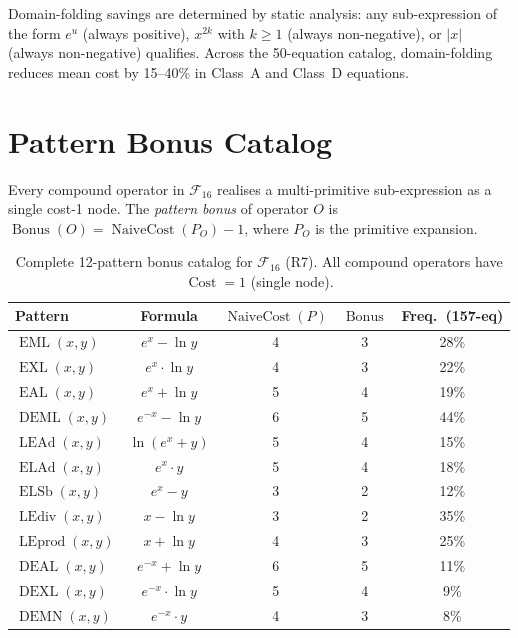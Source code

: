 \documentclass[12pt,a4paper]{article}
\theoremstyle{definition}
\newcommand{\EML}{\operatorname{EML}}
\newcommand{\EXL}{\operatorname{EXL}}
\newcommand{\EAL}{\operatorname{EAL}}
\newcommand{\DEML}{\operatorname{DEML}}
\newcommand{\ELAd}{\operatorname{ELAd}}
\newcommand{\ELSb}{\operatorname{ELSb}}
\newcommand{\LEAd}{\operatorname{LEAd}}
\newcommand{\LEdiv}{\operatorname{LEdiv}}
\newcommand{\LEprod}{\operatorname{LEprod}}
\newcommand{\DEAL}{\operatorname{DEAL}}
\newcommand{\DEXL}{\operatorname{DEXL}}
\newcommand{\DEMN}{\operatorname{DEMN}}
\newcommand{\Cost}{\operatorname{Cost}}
\newcommand{\NC}{\operatorname{NaiveCost}}
\newcommand{\Bonus}{\operatorname{Bonus}}
\begin{document}
Domain-folding savings are determined by static analysis: any sub-expression
of the form $e^u$ (always positive), $x^{2k}$ with $k \geq 1$ (always
non-negative), or $|x|$ (always non-negative) qualifies.  Across the 50-equation
catalog, domain-folding reduces mean cost by 15--40\% in Class~A and Class~D
equations.

\section{Pattern Bonus Catalog}
\label{sec:patterns}

Every compound operator in $\mathcal{F}_{16}$ realises a multi-primitive
sub-expression as a single cost-1 node.  The \emph{pattern bonus} of
operator $O$ is $\Bonus(O) = \NC(P_O) - 1$, where $P_O$ is the primitive
expansion.

\begin{table}[h]
\centering
\caption{Complete 12-pattern bonus catalog for $\mathcal{F}_{16}$ (R7).
         All compound operators have $\Cost=1$ (single node).}
\label{tab:patterns}
\smallskip
\begin{tabular}{@{}lcccc@{}}
\toprule
\textbf{Pattern} & \textbf{Formula} &
  $\NC(P)$ & $\Bonus$ & \textbf{Freq.\ (157-eq)} \\
\midrule
$\EML(x,y)$   & $e^x - \ln y$        & 4  & 3 & 28\% \\
$\EXL(x,y)$   & $e^x \cdot \ln y$    & 4  & 3 & 22\% \\
$\EAL(x,y)$   & $e^x + \ln y$        & 5  & 4 & 19\% \\
$\DEML(x,y)$  & $e^{-x} - \ln y$     & 6  & 5 & 44\% \\
$\LEAd(x,y)$  & $\ln(e^x + y)$       & 5  & 4 & 15\% \\
$\ELAd(x,y)$  & $e^x \cdot y$        & 5  & 4 & 18\% \\
$\ELSb(x,y)$  & $e^x - y$            & 3  & 2 & 12\% \\
$\LEdiv(x,y)$ & $x - \ln y$          & 3  & 2 & 35\% \\
$\LEprod(x,y)$& $x + \ln y$          & 4  & 3 & 25\% \\
$\DEAL(x,y)$  & $e^{-x} + \ln y$     & 6  & 5 & 11\% \\
$\DEXL(x,y)$  & $e^{-x} \cdot \ln y$ & 5  & 4 & 9\%  \\
$\DEMN(x,y)$  & $e^{-x} \cdot y$     & 4  & 3 & 8\%  \\
\bottomrule
\end{tabular}
\end{table}
\end{document}
